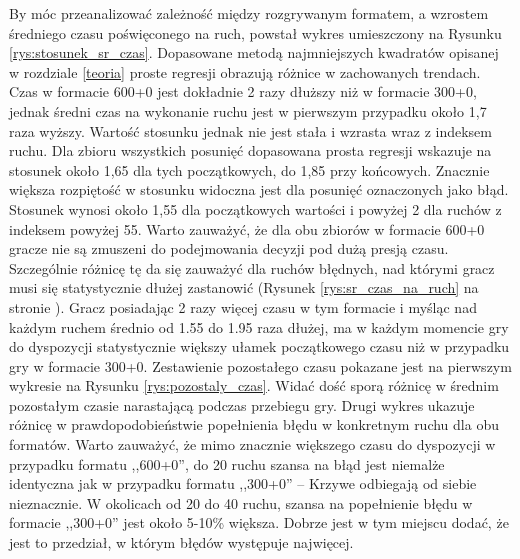 \documentclass[inzynierska]{pwr_wmat_praca_dyplomowa}
\theoremstyle{plain}
\numberwithin{theorem}{chapter}
\theoremstyle{definition}
\numberwithin{theorem}{chapter}
\begin{document}
By móc przeanalizować zależność między rozgrywanym formatem, a wzrostem średniego czasu poświęconego na ruch, powstał wykres umieszczony na Rysunku \ref{rys:stosunek_sr_czas}. Dopasowane metodą najmniejszych kwadratów opisanej w rozdziale \ref{teoria} proste regresji obrazują różnice w zachowanych trendach. Czas w formacie 600+0 jest dokładnie 2 razy dłuższy niż w formacie 300+0, jednak średni czas na wykonanie ruchu jest w pierwszym przypadku około 1,7 raza wyższy. Wartość stosunku jednak nie jest stała i wzrasta wraz z indeksem ruchu. Dla zbioru wszystkich posunięć dopasowana prosta regresji wskazuje na stosunek około 1,65 dla tych początkowych, do 1,85 przy końcowych. Znacznie większa rozpiętość w stosunku widoczna jest dla posunięć oznaczonych jako błąd. Stosunek wynosi około 1,55 dla początkowych wartości i powyżej 2 dla ruchów z indeksem powyżej 55. Warto zauważyć, że dla obu zbiorów w formacie 600+0 gracze nie są zmuszeni do podejmowania decyzji pod dużą presją czasu. Szczególnie różnicę tę da się zauważyć dla ruchów błędnych, nad którymi gracz musi się statystycznie dłużej zastanowić (Rysunek \ref{rys:sr_czas_na_ruch} na stronie \pageref{rys:sr_czas_na_ruch}). Gracz posiadając 2 razy więcej czasu w tym formacie i myśląc nad każdym ruchem średnio od 1.55 do 1.95 raza dłużej,  ma w każdym momencie gry do dyspozycji statystycznie większy ułamek początkowego czasu niż w przypadku gry w formacie 300+0. Zestawienie pozostałego czasu pokazane jest na pierwszym wykresie na Rysunku \ref{rys:pozostaly_czas}. Widać dość sporą różnicę w średnim pozostałym czasie narastającą podczas przebiegu gry. Drugi wykres ukazuje różnicę w prawdopodobieństwie popełnienia błędu w konkretnym ruchu dla obu formatów. Warto zauważyć, że mimo znacznie większego czasu do dyspozycji w przypadku formatu ,,600+0'', do 20 ruchu szansa na błąd jest niemalże identyczna jak w przypadku formatu ,,300+0'' -- Krzywe odbiegają od siebie nieznacznie. W okolicach od 20 do 40 ruchu, szansa na popełnienie błędu w formacie ,,300+0'' jest około 5-10\% większa. Dobrze jest w tym miejscu dodać, że jest to przedział, w którym błędów występuje najwięcej.
\end{document}
